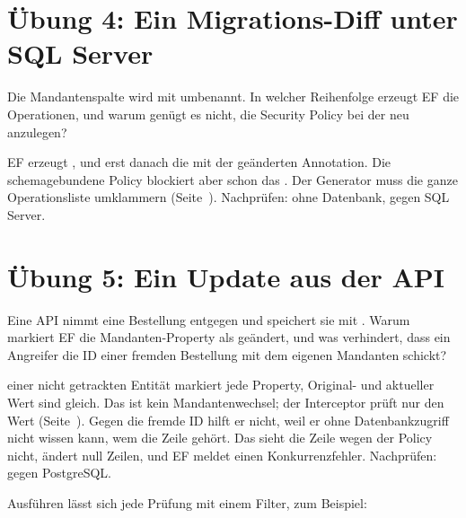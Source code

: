 \section{Übung 4: Ein Migrations-Diff unter SQL Server}

Die Mandantenspalte wird mit 
umbenannt. In welcher Reihenfolge erzeugt EF die Operationen, und warum genügt es nicht, die
Security Policy bei der  neu anzulegen?

\begin{note}[Lösung]
  EF erzeugt ,  und erst danach
  die  mit der geänderten Annotation. Die
  schemagebundene Policy blockiert aber schon das . Der Generator
  muss die ganze Operationsliste umklammern
  (Seite~\pageref{sec:sqlserver-schema-bound-changes}).
  Nachprüfen: 
  ohne Datenbank,  gegen
  SQL Server.
\end{note}

\section{Übung 5: Ein Update aus der API}

Eine API nimmt eine Bestellung entgegen und speichert sie mit . Warum markiert EF
die Mandanten-Property als geändert, und was verhindert, dass ein Angreifer die ID einer
fremden Bestellung mit dem eigenen Mandanten schickt?

\begin{note}[Lösung]
   einer nicht getrackten Entität markiert jede Property, Original- und aktueller
  Wert sind gleich. Das ist kein Mandantenwechsel; der Interceptor prüft nur den Wert
  (Seite~\pageref{sec:tracking-flag-versus-value}). Gegen die fremde ID hilft er nicht, weil er
  ohne Datenbankzugriff nicht wissen kann, wem die Zeile gehört. Das  sieht die
  Zeile wegen der Policy nicht, ändert null Zeilen, und EF meldet einen Konkurrenzfehler.
  Nachprüfen:  gegen PostgreSQL.
\end{note}

Ausführen lässt sich jede Prüfung mit einem Filter, zum Beispiel:

